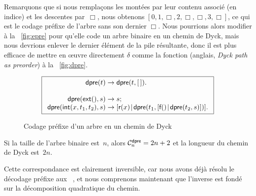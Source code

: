Remarquons que si nous remplaçons les montées par leur contenu associé
(en indice) et les descentes par~\(\Box\), nous obtenons \([0, 1,
\Box, 2, \Box, \Box, 3, \Box]\), ce qui est le codage
préfixe de l'arbre sans
son dernier \(\Box\). Nous pourrions alors modifier
 à la \fig~\vref{fig:epre} pour
qu'elle code un arbre binaire en un chemin de Dyck, mais nous devrions enlever le dernier élément de la pile
résultante, donc il est plus efficace de mettre en œuvre
directement \(\delta\) comme la fonction
 (anglais, \emph{Dyck path as
  preorder}) à la \fig~\vref{fig:dpre}.
\begin{figure}
\begin{equation*}
\boxed{
\begin{array}{r@{\;}c@{\;}l}
\fun{dpre}(t) & \rightarrow & \fun{dpre}(t,\el).\\
\\
\fun{dpre}(\fun{ext}(),s) & \rightarrow & s;\\
\fun{dpre}(\fun{int}(x,t_1,t_2),s)
  & \rightarrow
  & \cons{\fun{r}(x)}{\fun{dpre}(t_1,\cons{\fun{f}()}{\fun{dpre}(t_2,s)})}.
\end{array}}
\end{equation*}
\caption{Codage préfixe d'un arbre en un chemin de Dyck}
\label{fig:dpre}
\end{figure}
Si la taille de l'arbre binaire est~\(n\), alors \(\C{\fun{dpre}}{n} =
2n+2\) et la longueur du chemin de
Dyck est~\(2n\).

Cette correspondance est clairement inversible, car nous avons déjà
résolu le décodage préfixe aux
\figs~,
 et nous comprenons maintenant que
l'inverse est fondé sur la décomposition quadratique du
chemin.

